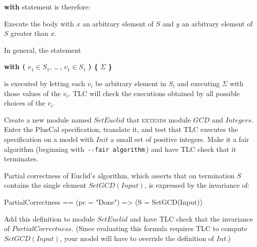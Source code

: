 \textbf{with} statement is therefore:
\begin{display}
Execute the body with $x$ an arbitrary element of $S$ and $y$ an
arbitrary element of $S$ greater than $x$.
\end{display}
In general, the statement
\begin{display}
\textbf{with (} $v_{1} \in S_{1}$, \ldots\,, $v_{1} \in S_{1}$ \textbf{) \{}
 $\Sigma$ \textbf{\}}%
\end{display}
is executed by letting each $v_{i}$ be arbitrary element in $S_{i}$
and executing $\Sigma$ with those values of the $v_{i}$.  TLC will check
the executions obtained by all possible choices of the $v_{i}$.

Create a new module named $SetEuclid$ that \textsc{extends} module
$GCD$ and $Integers$.  Enter the PlusCal specification, translate it,
and test that TLC executes the specification on a model with $Init$ a
small set of positive integers.  Make it a fair algorithm (beginning
with \,\texttt{-{}-fair algorithm}\,) and have TLC check that it terminates.

Partial correctness of Euclid's algorithm, which asserts that 
on termination $S$ contains the single element $SetGCD(Input)$, 
is expressed by the invariance of:
\begin{display}
\begin{notla}
PartialCorrectness == (pc = "Done") => (S = {SetGCD(Input)})
\end{notla}
\begin{tlatex}
\end{tlatex}
\end{display}
Add this definition to module $SetEuclid$ and have TLC check that the
invariance of $PartialCorrectness$.  (Since evaluating this formula
requires TLC to compute $SetGCD(Input)$, your model will have to
override the definition of $Int$.)

